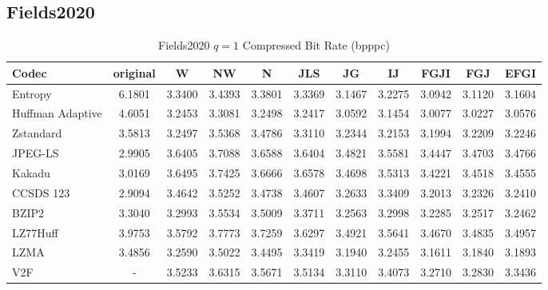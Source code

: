 \documentclass{article}
\begin{document}
\subsection{Fields2020}
\begin{table}[h!]
    \centering
    \caption{Fields2020 $q=1$ Compressed Bit Rate (bpppc)}
    \begin{tabular}{|l|cccccccccc|}
\hline
Codec &  original &      W &     NW &      N &    JLS &     JG &     IJ &   FGJI &    FGJ &   EFGI \\
\hline
Entropy &    6.1801 & 3.3400 & 3.4393 & 3.3801 & 3.3369 & 3.1467 & 3.2275 & 3.0942 & 3.1120 & 3.1604 \\ \hline
Huffman Adaptive                                &    4.6051 &  3.2453 &  3.3081 &  3.2498 &  3.2417 &  3.0592 &  3.1454 &  3.0077 & 3.0227 &  3.0576 \\
Zstandard                              &    3.5813 & 3.2497 & 3.5368 & 3.4786 &  3.3110 & 3.2344 &   3.2153 & 3.1994 & 3.2209 & 3.2246 \\
JPEG-LS                                &    2.9905 & 3.6405 & 3.7088 & 3.6588 & 3.6404 & 3.4821 & 3.5581 & 3.4447 & 3.4703 & 3.4766 \\
Kakadu                       &    3.0169 & 3.6495 & 3.7425 & 3.6666 & 3.6578 & 3.4698 & 3.5313 & 3.4221 & 3.4518 & 3.4555 \\
CCSDS 123 &    2.9094 & 3.4642 & 3.5252 & 3.4738 & 3.4607 & 3.2633 & 3.3409 & 3.2013 & 3.2326 & 3.2410 \\
BZIP2                            &    3.3040 & 3.2993 & 3.5534 & 3.5009 & 3.3711 & 3.2563 & 3.2998 & 3.2285 & 3.2517 & 3.2462 \\
LZ77Huff                       &    3.9753 & 3.5792 & 3.7773 & 3.7259 & 3.6297 & 3.4921 & 3.5641 & 3.4670 & 3.4835 & 3.4957 \\
LZMA                           &    3.4856 & 3.2590 & 3.5022 &  3.4495 & 3.3419 & 3.1940 & 3.2455 &  3.1611 & 3.1840 &  3.1893 \\
V2F                      &   - & 3.5233 & 3.6315 & 3.5671 & 3.5134 & 3.3110 & 3.4073 &  3.2710 & 3.2830 & 3.3436 \\
\hline
\end{tabular}

\end{table}
\end{document}

